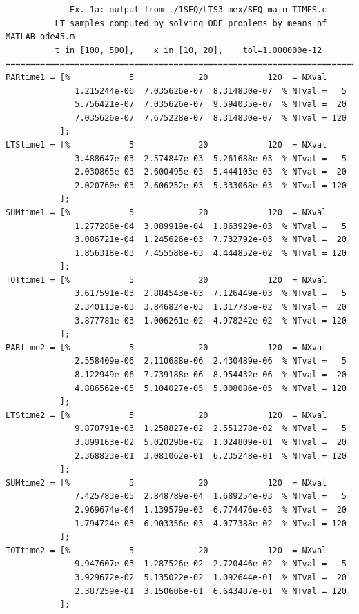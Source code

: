 \documentclass[a4paper,10pt]{report}%
\begin{document}
\begin{lstlisting}
             Ex. 1a: output from ./1SEQ/LTS3_mex/SEQ_main_TIMES.c
          LT samples computed by solving ODE problems by means of MATLAB ode45.m
          t in [100, 500],    x in [10, 20],    tol=1.000000e-12
====================================================================================
PARtime1 = [%            5             20            120  = NXval
              1.215244e-06  7.035626e-07  8.314830e-07	% NTval =   5
              5.756421e-07  7.035626e-07  9.594035e-07	% NTval =  20
              7.035626e-07  7.675228e-07  8.314830e-07	% NTval = 120
           ];
LTStime1 = [%            5             20            120  = NXval
              3.488647e-03  2.574847e-03  5.261688e-03	% NTval =   5
              2.030865e-03  2.600495e-03  5.444103e-03	% NTval =  20
              2.020760e-03  2.606252e-03  5.333068e-03	% NTval = 120
           ];
SUMtime1 = [%            5             20            120  = NXval
              1.277286e-04  3.089919e-04  1.863929e-03	% NTval =   5
              3.086721e-04  1.245626e-03  7.732792e-03	% NTval =  20
              1.856318e-03  7.455588e-03  4.444852e-02	% NTval = 120
           ];
TOTtime1 = [%            5             20            120  = NXval
              3.617591e-03  2.884543e-03  7.126449e-03	% NTval =   5
              2.340113e-03  3.846824e-03  1.317785e-02	% NTval =  20
              3.877781e-03  1.006261e-02  4.978242e-02	% NTval = 120
           ];
PARtime2 = [%            5             20            120  = NXval
              2.558409e-06  2.110688e-06  2.430489e-06	% NTval =   5
              8.122949e-06  7.739188e-06  8.954432e-06	% NTval =  20
              4.886562e-05  5.104027e-05  5.008086e-05	% NTval = 120
           ];
LTStime2 = [%            5             20            120  = NXval
              9.870791e-03  1.258827e-02  2.551278e-02	% NTval =   5
              3.899163e-02  5.020290e-02  1.024809e-01	% NTval =  20
              2.368823e-01  3.081062e-01  6.235248e-01	% NTval = 120
           ];
SUMtime2 = [%            5             20            120  = NXval
              7.425783e-05  2.848789e-04  1.689254e-03	% NTval =   5
              2.969674e-04  1.139579e-03  6.774476e-03	% NTval =  20
              1.794724e-03  6.903356e-03  4.077388e-02	% NTval = 120
           ];
TOTtime2 = [%            5             20            120  = NXval
              9.947607e-03  1.287526e-02  2.720446e-02	% NTval =   5
              3.929672e-02  5.135022e-02  1.092644e-01	% NTval =  20
              2.387259e-01  3.150606e-01  6.643487e-01	% NTval = 120
           ];
\end{lstlisting}
\end{document}
